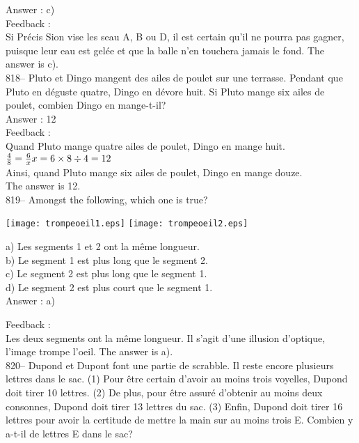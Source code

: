﻿\documentclass[letterpaper, 12pt]{article}
\begin{document}
Answer : c)\\

Feedback : \\
Si Pr\'ecis Sion vise les seau A, B ou D, il est certain qu'il ne pourra pas
gagner, puisque leur eau est gel\'ee et que la balle n'en touchera jamais le
fond.  The answer is c).\\

818-- Pluto et Dingo mangent des ailes de poulet sur une terrasse.  Pendant
que Pluto en d\'eguste quatre, Dingo en d\'evore huit.  Si Pluto mange six
ailes de poulet, combien Dingo en mange-t-il?\\

Answer : 12\\

Feedback : \\
Quand Pluto mange quatre ailes de poulet, Dingo en mange huit.\\[2mm]
$\frac{4}{8}=\frac{6}{x}\\[2mm]
x=6\times8\div4=12$\\[2mm]
Ainsi, quand Pluto mange six ailes de poulet, Dingo en mange douze.\\[2mm]
The answer is 12.\\





819-- Amongst the following, which one is true?\\
    \begin{center}
    \texttt{[image: trompeoeil1.eps]}
\texttt{[image: trompeoeil2.eps]}
    \end{center}
a) Les segments 1 et 2 ont la m\^eme longueur.\\
b) Le segment 1 est plus long que le segment 2.\\
c) Le segment 2 est plus long que le segment 1.\\
d) Le segment 2 est plus court que le segment 1.\\

Answer : a)

Feedback : \\
Les deux segments ont la m\^eme longueur.  Il s'agit d'une illusion
d'optique, l'image trompe l'oeil.  The answer is a).\\

820-- Dupond et Dupont font une partie de scrabble.  Il reste encore
plusieurs lettres dans le sac.  (1) Pour \^etre certain d'avoir au moins
trois voyelles, Dupond doit tirer 10 lettres.  (2) De plus, pour \^etre
assur\'e d'obtenir au moins deux consonnes, Dupond doit tirer 13 lettres du
sac.  (3) Enfin, Dupond doit tirer 16 lettres pour avoir la certitude de
mettre la main sur au moins trois E. Combien y a-t-il de lettres E dans le
sac?\\
\end{document}
